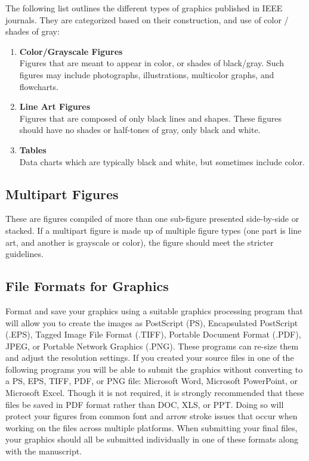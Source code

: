 \documentclass{IEEEtaes}
\begin{document}
The following list outlines the different types of graphics published in IEEE journals. They are categorized based on their construction, and use of color / shades of gray:

\begin{enumerate}
\def\labelenumi{\arabic{enumi})}
\item
  \textbf{Color/Grayscale Figures}\\
  Figures that are meant to appear in color, or shades of black/gray. Such figures may include photographs, illustrations, multicolor graphs, and flowcharts.
\item
  \textbf{Line Art Figures}\\
  Figures that are composed of only black lines and shapes. These figures should have no shades or half-tones of gray, only black and white.
\item
  \textbf{Tables}\\
  Data charts which are typically black and white, but sometimes include color.
\end{enumerate}

\subsection{Multipart Figures}

These are figures compiled of more than one sub-figure presented side-by-side or stacked. If a multipart figure is made up of multiple figure types (one part is line art, and another is grayscale or color), the figure should meet the stricter guidelines.

\subsection{File Formats for Graphics}

Format and save your graphics using a suitable graphics processing program that will allow you to create the images as PostScript (PS), Encapsulated PostScript (.EPS), Tagged Image File Format (.TIFF), Portable Document Format (.PDF), JPEG, or Portable Network Graphics (.PNG). These programs can re-size them and adjust the resolution settings. If you created your source files in one of the following programs you will be able to submit the graphics without converting to a PS, EPS, TIFF, PDF, or PNG file: Microsoft Word, Microsoft PowerPoint, or Microsoft Excel. Though it is not required, it is strongly recommended that these files be saved in PDF format rather than DOC, XLS, or PPT. Doing so will protect your figures from common font and arrow stroke issues that occur when working on the files across multiple platforms. When submitting your final files, your graphics should all be submitted individually in one of these formats along with the manuscript.
\end{document}
